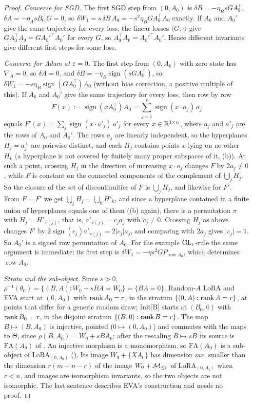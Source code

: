 \begin{proof}
\emph{Converse for SGD.} The first SGD step from $(0,A_0)$ is $\delta B=-\eta_BsGA_0^\top$, $\delta A=-\eta_AsB_0^\top G=0$,
so $\delta W_1=s\,\delta B\,A_0=-s^2\eta_BGA_0^\top A_0$ exactly. If $A_0$ and $A_0'$ give the same trajectory for every loss,
the linear losses $\langle G,\cdot\rangle$ give $GA_0^\top A_0=GA_0'^\top A_0'$ for every $G$, so $A_0^\top A_0=A_0'^\top A_0'$.
Hence different invariants give different first steps for some loss.

\emph{Converse for Adam at $\varepsilon=0$.} The first step from $(0,A_0)$ with zero state has $\nabla_A=0$, so $\delta A=0$,
and $\delta B=-\eta_B\operatorname{sign}(sGA_0^\top)$, so $\delta W_1=-s\eta_B\operatorname{sign}(GA_0^\top)A_0$ (without bias
correction, a positive multiple of this). If $A_0$ and $A_0'$ give the same trajectory for every loss, then row by row
\[F(x):=\operatorname{sign}(xA_0^\top)A_0=\sum_{j=1}^r\operatorname{sign}(x\cdot a_j)\,a_j\]
equals $F'(x)=\sum_j\operatorname{sign}(x\cdot a'_j)\,a'_j$ for every $x\in\mathbb{R}^{1\times n}$, where $a_j$ and $a'_j$ are the rows
of $A_0$ and $A_0'$. The rows $a_j$ are linearly independent, so the hyperplanes $H_j=a_j^\perp$ are pairwise distinct, and
each $H_j$ contains points $x$ lying on no other $H_k$ (a hyperplane is not covered by finitely many proper subspaces of
it, (b)). At such a point, crossing $H_j$ in the direction of increasing $x\cdot a_j$ changes $F$ by $2a_j\ne0$, while $F$ is
constant on the connected components of the complement of $\bigcup_jH_j$. So the closure of the set of discontinuities of
$F$ is $\bigcup_jH_j$, and likewise for $F'$. From $F=F'$ we get $\bigcup_jH_j=\bigcup_kH'_k$, and since a hyperplane
contained in a finite union of hyperplanes equals one of them ((b) again), there is a permutation $\pi$ with $H_j=H'_{\pi(j)}$, that is,
$a'_{\pi(j)}=c_ja_j$ with $c_j\ne0$. Crossing $H_j$ as above changes $F'$ by
$2\operatorname{sign}(c_j)a'_{\pi(j)}=2\lvert c_j\rvert a_j$, and comparing with $2a_j$ gives $\lvert c_j\rvert=1$. So
$A_0'$ is a signed row permutation of $A_0$. For the example $\mathrm{GL}_r$-rule the same argument is immediate: its first step is
$\delta W_1=-\eta s^2GP_{\operatorname{row}A_0}$, which determines $\operatorname{row}A_0$.

\emph{Strata and the sub-object.} Since $s>0$, $\rho^{-1}(\theta_0)=\{(B,A):W_0+sBA=W_0\}=\{BA=0\}$. Random-$A$ LoRA and
EVA start at $(0,A_0)$ with $\operatorname{rank} A_0=r$, in the stratum $\{(0,A):\operatorname{rank} A=r\}$, at points that differ for a generic random
draw; Init[B] starts at $(B_0,0)$ with $\operatorname{rank} B_0=r$, in the disjoint stratum $\{(B,0):\operatorname{rank} B=r\}$. The map $B\mapsto(B,A_0)$
is injective, pointed ($0\mapsto(0,A_0)$) and commutes with the maps to $\Theta$, since $\rho(B,A_0)=W_0+sBA_0$; after the
rescaling $B\mapsto sB$ its source is $\mathrm{FA}(A_0)$ of . An injective morphism is a
monomorphism, so $\mathrm{FA}(A_0)$ is a sub-object of $\mathrm{LoRA}_{(0,A_0)}$ (). Its image
$W_0+\{XA_0\}$ has dimension $mr$, smaller than the dimension $r(m+n-r)$ of the image $W_0+\mathcal{M}_{\le r}$ of
$\mathrm{LoRA}_{(0,A_0)}$ when $r<n$, and images are isomorphism invariants, so the two objects are not isomorphic. The
last sentence describes EVA's construction and needs no proof.
\end{proof}
